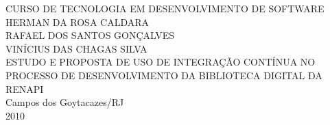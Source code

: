 \begin{titlepage}
 \begin{figure}[ht]
 \centering
 \end{figure}
 \begin{center}
   {\large CURSO DE TECNOLOGIA EM DESENVOLVIMENTO DE SOFTWARE} \\ [3.5cm]
   {\large HERMAN DA ROSA CALDARA} \\
   {\large RAFAEL DOS SANTOS GONÇALVES} \\
   {\large VINÍCIUS DAS CHAGAS SILVA} \\ [4cm]
   {\large ESTUDO E PROPOSTA DE USO DE INTEGRAÇÃO CONTÍNUA NO PROCESSO DE DESENVOLVIMENTO DA BIBLIOTECA DIGITAL DA RENAPI} \\
   \vfill
   {\large Campos dos Goytacazes/RJ} \\
   {\large 2010}
 \end{center}
\end{titlepage}
